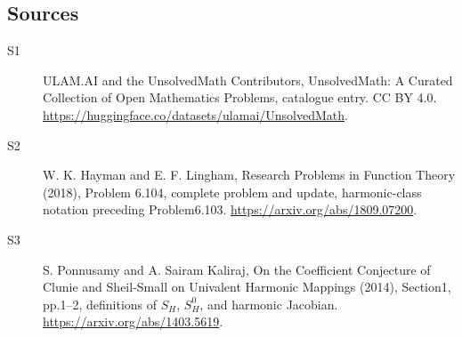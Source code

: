 \documentclass[11pt]{article}
\begin{document}
\subsection{Sources}
\begin{description}
\item[\hypertarget{source:statement:1}{S1}] ULAM.AI and the UnsolvedMath Contributors, UnsolvedMath: A Curated Collection of Open Mathematics Problems, catalogue entry. CC BY 4.0. \url{https://huggingface.co/datasets/ulamai/UnsolvedMath}.
\item[\hypertarget{source:statement:2}{S2}] W. K. Hayman and E. F. Lingham, Research Problems in Function Theory (2018), Problem 6.104, complete problem and update, harmonic-class notation preceding Problem6.103. \url{https://arxiv.org/abs/1809.07200}.
\item[\hypertarget{source:statement:3}{S3}] S. Ponnusamy and A. Sairam Kaliraj, On the Coefficient Conjecture of Clunie and Sheil-Small on Univalent Harmonic Mappings (2014), Section1, pp.1--2, definitions of $S_H$, $S_H^0$, and harmonic Jacobian. \url{https://arxiv.org/abs/1403.5619}.
\end{description}
\label{end:statement}
\end{document}
